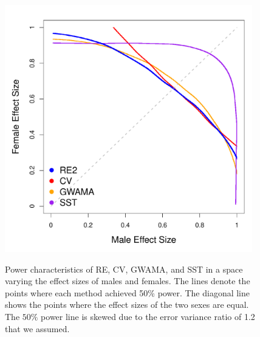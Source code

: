 \documentclass[11pt]{article}
\begin{document}
\begin{figure}[h]
\centering
{\includegraphics[width=0.96\textwidth]{../Figures/Fig4/power50_case2_CHL.pdf}}
\caption{Power characteristics of
RE, CV, GWAMA, and SST in a space 
varying the effect sizes of males and females.
The lines denote the points where each method achieved 50\% power. 
The diagonal line shows the points where the effect sizes of the two sexes are equal.
The $50\%$ power line is skewed due to the error variance ratio of 1.2 that we assumed.
}
\label{power_comp11}
\end{figure}
\end{document}
